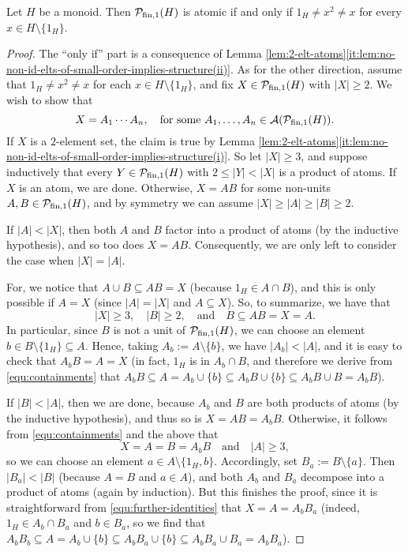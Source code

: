 \begin{thm}\label{th:atomicity}
	Let $H$ be a monoid. Then $\mathcal P_{\textrm{fin}, 1}(H)$ is atomic if and only if $1_H \ne x^2 \ne x$ for every $x \in H \setminus \{1_H\}$.
\end{thm}
%
\begin{proof}
	The ``only if'' part is a consequence of Lemma \ref{lem:2-elt-atoms}\ref{it:lem:no-non-id-elts-of-small-order-implies-structure(ii)}.
	As for the other direction, assume that $1_H \ne x^2 \ne x$ for each $x\in H\setminus\{1_H\}$, and fix $X \in \mathcal P_{{\textrm{fin}, 1}}(H)$ with $|X| \ge 2$.
	We wish to show that 
	\[
	X = A_1 \cdots A_n, \quad\text{for some }A_1, \ldots, A_n \in \mathcal{A}(\mathcal P_{\textrm{fin},1}(H)).
	\]
	If $X$ is a $2$-element set, the claim is true by Lemma \ref{lem:2-elt-atoms}\ref{it:lem:no-non-id-elts-of-small-order-implies-structure(i)}. So let $|X| \ge 3$, and suppose inductively that every $Y \in \mathcal{P}_{\textrm{fin}, 1}(H)$ with $2 \le |Y| < |X|$ is a product of atoms. If $X$ is an atom, we are done.
	Otherwise, $X = A B$ for some non-units $A, B \in \mathcal{P}_{\textrm{fin}, 1}(H)$, and by symmetry we can assume $|X| \ge |A| \ge |B| \ge 2$. 
	
	If $|A| < |X|$, then both $A$ and $B$ factor into a product of atoms (by the inductive hypothesis), and so too does $X=A B$. Consequently, we are only left to consider the case when $|X| = |A|$. 
	
	For, we notice that 
	$
	A \cup B \subseteq A B = X 
	$
	(because $1_H \in A \cap B$), and this is only possible if $A = X$ (since $|A| = |X|$ and $A \subseteq X$). So, to summarize, we have that
	\begin{equation}\label{equ:containments}
		|X| \ge 3, \quad |B| \ge 2, \quad\text{and}\quad B \subseteq AB = X = A.
	\end{equation}
	In particular, since $B$ is not a unit of $\mathcal P_{\textrm{fin},1}(H)$, we can choose an element $b\in B\setminus\{1_H\} \subseteq A$. Hence, taking $A_b := A \setminus \{b\}$, we have $|A_b| < |A|$, and it is easy to check that $A_b B = A = X$ (in fact, $1_H$ is in $A_b \cap B$, and therefore we derive from \eqref{equ:containments} that $
	A_b B \subseteq A = A_b \cup \{b\} \subseteq A_b B \cup \{b\} \subseteq A_b B \cup B = A_b B$).
	
	If $|B|<|A|$, then we are done, because $A_b$ and $B$ are both products of atoms (by the inductive hypothesis), and thus so is $X = AB = A_bB$.
	Otherwise, it follows from \eqref{equ:containments} and the above that 
	\begin{equation}\label{equ:further-identities}
		X = A = B = A_b B \quad\text{and}\quad |A| \ge 3, 
	\end{equation}
	so we can choose an element $a \in A \setminus\{1_H,b\}$. Accordingly, set $B_a := B \setminus \{a\}$. Then $|B_a| < |B|$ (because $A = B$ and $a \in A$), and both $A_b$ and $B_a$ decompose into a product of atoms (again by induction). But this finishes the proof, since it is straightforward from \eqref{equ:further-identities} that $X = A = A_b B_a$ (indeed, $1_H \in A_b \cap B_a$ and $b \in B_a$, so we find that $
	A_b B_b \subseteq A = A_b \cup \{b\} \subseteq A_b B_a \cup \{b\} \subseteq A_b B_a \cup B_a = A_b B_a$).
\end{proof}

